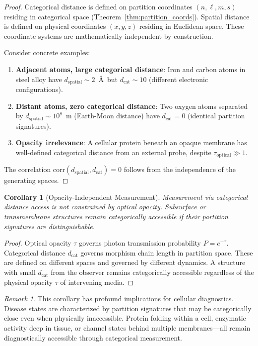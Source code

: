 \documentclass[aps,prd,twocolumn,superscriptaddress,floatfix,nofootinbib]{revtex4-2}
\newtheorem{corollary}[theorem]{Corollary}
\theoremstyle{remark}
\newtheorem{remark}[theorem]{Remark}
\newcommand{\dcat}{d_{\mathrm{cat}}}
\begin{document}
\begin{proof}
Categorical distance is defined on partition coordinates $(n, \ell, m, s)$ residing in categorical space (Theorem~\ref{thm:partition_coords}). Spatial distance is defined on physical coordinates $(x, y, z)$ residing in Euclidean space. These coordinate systems are mathematically independent by construction.

Consider concrete examples:
\begin{enumerate}
\item \textbf{Adjacent atoms, large categorical distance}: Iron and carbon atoms in steel alloy have $d_{\mathrm{spatial}} \sim 2$~\AA\ but $\dcat \sim 10$ (different electronic configurations).
\item \textbf{Distant atoms, zero categorical distance}: Two oxygen atoms separated by $d_{\mathrm{spatial}} \sim 10^8$~m (Earth-Moon distance) have $\dcat = 0$ (identical partition signatures).
\item \textbf{Opacity irrelevance}: A cellular protein beneath an opaque membrane has well-defined categorical distance from an external probe, despite $\tau_{\mathrm{optical}} \gg 1$.
\end{enumerate}

The correlation $\text{corr}(d_{\mathrm{spatial}}, \dcat) = 0$ follows from the independence of the generating spaces.
\end{proof}

\begin{corollary}[Opacity-Independent Measurement]
\label{cor:opacity_indep}
Measurement via categorical distance access is not constrained by optical opacity. Subsurface or transmembrane structures remain categorically accessible if their partition signatures are distinguishable.
\end{corollary}

\begin{proof}
Optical opacity $\tau$ governs photon transmission probability $P = e^{-\tau}$. Categorical distance $\dcat$ governs morphism chain length in partition space. These are defined on different spaces and governed by different dynamics. A structure with small $\dcat$ from the observer remains categorically accessible regardless of the physical opacity $\tau$ of intervening media.
\end{proof}

\begin{remark}
This corollary has profound implications for cellular diagnostics. Disease states are characterized by partition signatures that may be categorically close even when physically inaccessible. Protein folding within a cell, enzymatic activity deep in tissue, or channel states behind multiple membranes---all remain diagnostically accessible through categorical measurement.
\end{remark}
\end{document}
